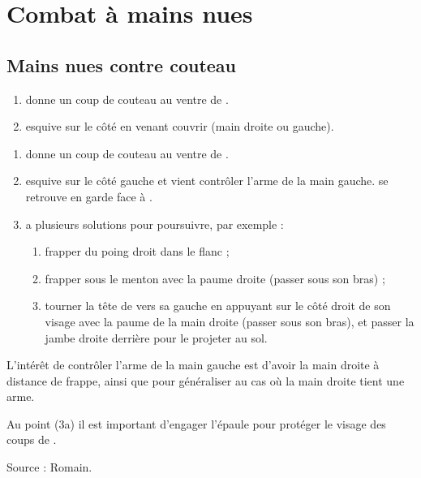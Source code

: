 \chapter{Combat à mains nues}

\section{Mains nues contre couteau}

\begin{exercice}

\begin{enumerate}
	\item \A donne un coup de couteau au ventre de \D.
	
	\item \D esquive sur le côté en venant couvrir (main droite ou gauche).
\end{enumerate}

\end{exercice}



\begin{technique}

\begin{enumerate}
	\item \A donne un coup de couteau au ventre de \D.
	
	\item \D esquive sur le côté gauche et vient contrôler l'arme de la main gauche.
	\D se retrouve en garde face à \A.
	
	\item \D a plusieurs solutions pour poursuivre, par exemple :
	\begin{enumerate}
		\item frapper du poing droit dans le flanc ;
		
		\item frapper \A sous le menton avec la paume droite (passer sous son bras) ;
		
		\item tourner la tête de \A vers sa gauche en appuyant sur le côté droit de son visage avec la paume de la main droite (passer sous son bras), et passer la jambe droite derrière \A pour le projeter au sol.
	\end{enumerate}

\end{enumerate}

L'intérêt de contrôler l'arme de la main gauche est d'avoir la main droite à distance de frappe, ainsi que pour généraliser au cas où la main droite tient une arme.

Au point (3a) il est important d'engager l'épaule pour protéger le visage des coups de \A.

Source : Romain.

\end{technique}



